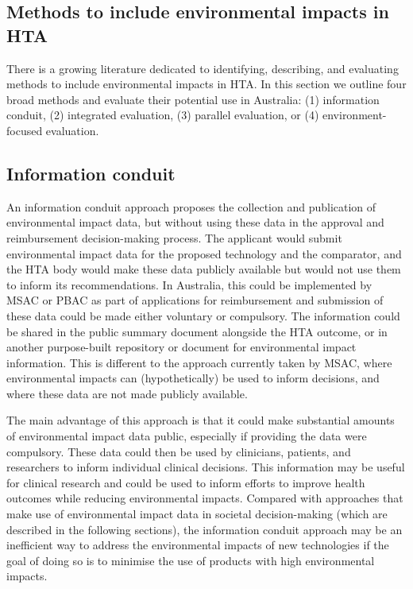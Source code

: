 \begin{refsection}


\section{Methods to include environmental impacts in HTA}
There is a growing literature dedicated to identifying, describing, and evaluating methods to include environmental impacts in HTA.\cite{guirado-fuentes_main_2023, toolan_environmental_2023, marsh_expanding_2016, desterbecq_inclusion_2023, mcalister_incorporating_2022, pinho-gomes_incorporating_2022, williams_methods_2024, ardito_which_2025} In this section we outline four broad methods and evaluate their potential use in Australia: (1) information conduit, (2) integrated evaluation, (3) parallel evaluation, or (4) environment-focused evaluation.\cite{toolan_environmental_2023}

\subsection{Information conduit}
An information conduit approach proposes the collection and publication of environmental impact data, but without using these data in the approval and reimbursement decision-making process. The applicant would submit environmental impact data for the proposed technology and the comparator, and the HTA body would make these data publicly available but would not use them to inform its recommendations. In Australia, this could be implemented by MSAC or PBAC as part of applications for reimbursement and submission of these data could be made either voluntary or compulsory. The information could be shared in the public summary document alongside the HTA outcome, or in another purpose-built repository or document for environmental impact information. This is different to the approach currently taken by MSAC, where environmental impacts can (hypothetically) be used to inform decisions, and where these data are not made publicly available.

The main advantage of this approach is that it could make substantial amounts of environmental impact data public, especially if providing the data were compulsory. These data could then be used by clinicians, patients, and researchers to inform individual clinical decisions. This information may be useful for clinical research and could be used to inform efforts to improve health outcomes while reducing environmental impacts. Compared with approaches that make use of environmental impact data in societal decision-making (which are described in the following sections), the information conduit approach may be an inefficient way to address the environmental impacts of new technologies if the goal of doing so is to minimise the use of products with high environmental impacts. 


\end{refsection}
